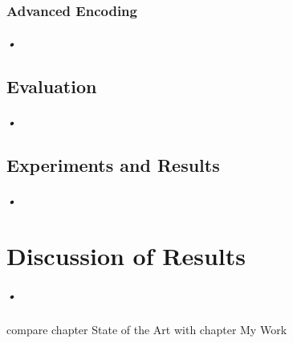 \documentclass{report}
\begin{document}
\subsection{Advanced Encoding}
\paragraph*{•}

\section{Evaluation}
\paragraph*{•}
\section{Experiments and Results}
\paragraph*{•}
\chapter{Discussion of Results}
\paragraph*{•}
compare chapter State of the Art with chapter My Work \cite{LifschitzASP}
\end{document}

